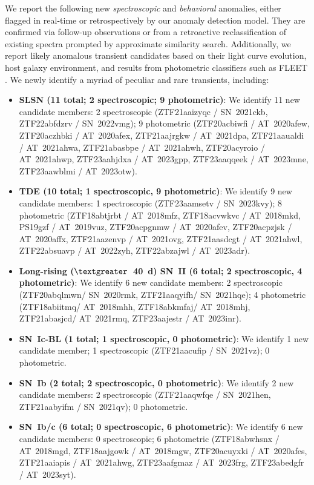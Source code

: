 \documentclass[twocolumn]{aastex63}
\begin{document}
We report the following new \emph{spectroscopic} and \emph{behavioral} anomalies, either flagged in real-time or retrospectively by our anomaly detection model. They are confirmed via follow-up observations or from a retroactive reclassification of existing spectra prompted by approximate similarity search. Additionally, we report likely anomalous transient candidates based on their light curve evolution, host galaxy environment, and results from photometric classifiers such as FLEET \citep{Gomez2020}. We newly identify a myriad of peculiar and rare transients, including:
\begin{itemize}
    \item \textbf{SLSN (11 total; 2 spectroscopic; 9 photometric)}: We identify 11 new candidate members: 2 spectroscopic (ZTF21aaizyqc / SN~2021ckb, ZTF22abfdzrv / SN~2022vmg); 9 photometric (ZTF20acbiwfi / AT~2020afew, ZTF20aczhbki / AT~2020afex, ZTF21aajrgkw / AT~2021dpa, ZTF21aaualdi / AT~2021ahwa, ZTF21abasbpe / AT~2021ahwh, ZTF20acyroio / AT~2021ahwp, ZTF23aahjdxa / AT~2023gpp, ZTF23aaqqeek / AT~2023mne, ZTF23aawblmi / AT~2023otw).
    \item \textbf{TDE (10 total; 1 spectroscopic, 9 photometric)}: We identify 9 new candidate members: 1 spectroscopic (ZTF23aamsetv / SN~2023kvy); 8 photometric (ZTF18abtjrbt / AT~2018mfz, ZTF18acvwkvc / AT~2018mkd, PS19gzf / AT~2019vuz, ZTF20acpgnmw / AT~2020afev, ZTF20acpzjsk / AT~2020affx, ZTF21aazenvp / AT~2021ovg, ZTF21aasdcgt / AT~2021ahwl, ZTF22absuavp / AT~2022zyh, ZTF22abzajwl / AT~2023adr).
    \item \textbf{Long-rising ($\textgreater$~40~d) SN~II (6 total; 2 spectroscopic, 4 photometric)}: We identify 6 new candidate members: 2 spectroscopic (ZTF20abqlmwn/ SN~2020rmk, ZTF21aaqyifh/ SN~2021hqe); 4 photometric (ZTF18abiitmq/ AT~2018mhh, ZTF18abkmfaj/ AT~2018mhj, ZTF21abasjcd/ AT~2021rmq, ZTF23aajestr / AT~2023inr).
    \item \textbf{SN~Ic-BL (1 total; 1 spectroscopic, 0 photometric)}: We identify 1 new candidate member; 1 spectroscopic (ZTF21aacufip / SN~2021vz); 0 photometric.
    \item \textbf{SN~Ib (2 total; 2 spectroscopic, 0 photometric)}: We identify 2 new candidate members: 2 spectroscopic (ZTF21aaqwfqe / SN~2021hen, ZTF21aabyifm / SN~2021qv); 0 photometric.
    \item \textbf{SN~Ib/c (6 total; 0 spectroscopic, 6 photometric)}: We identify 6 new candidate members: 0 spectroscopic; 6 photometric (ZTF18abwhsnx / AT~2018mgd, ZTF18aajgowk / AT~2018mgw, ZTF20acuyxki / AT~2020afes, ZTF21aaiapis / AT~2021ahwg, ZTF23aafgmaz / AT~2023frg, ZTF23abedgfr / AT~2023syt).

\end{itemize}
\end{document}
